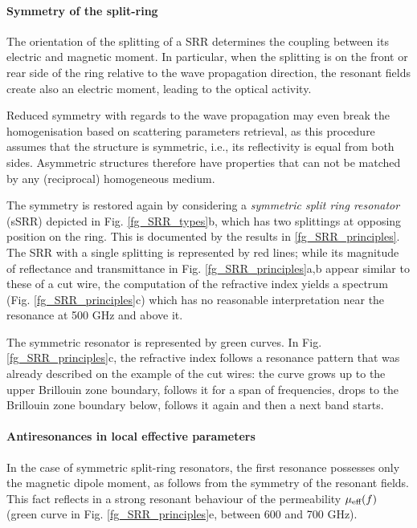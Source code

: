 \paragraph{Symmetry of the split-ring}%
The orientation of the splitting of a SRR determines the coupling between its electric and magnetic moment. In particular, when the splitting is on the front or rear side of the ring relative to the wave propagation direction, the resonant fields create also an electric moment, leading to the optical activity.

Reduced symmetry with regards to the wave propagation may even break the homogenisation based on scattering parameters retrieval, as this procedure assumes that the structure is symmetric, i.e., its reflectivity is equal from both sides. Asymmetric structures therefore have properties that can not be matched by any (reciprocal) homogeneous medium. 

The symmetry is restored again by considering a \textit{symmetric split ring resonator} (sSRR) depicted in Fig. \ref{fg_SRR_types}b, which has two splittings at opposing position on the ring. 
This is documented by the results in \ref{fg_SRR_principles}. The SRR with a single splitting is represented by red lines; while its magnitude of reflectance and transmittance in Fig. \ref{fg_SRR_principles}a,b appear similar to these of a cut wire, the computation of the refractive index yields a spectrum (Fig. \ref{fg_SRR_principles}c) which has no reasonable interpretation near the resonance at 500 GHz and above it. 

The symmetric resonator is represented by green curves. In Fig. \ref{fg_SRR_principles}c, the refractive index follows a resonance pattern that was already described on the example of the cut wires: the curve grows up to the upper Brillouin zone boundary, follows it for a span of frequencies, drops to the Brillouin zone boundary below, follows it again and then a next band starts. 

\paragraph{Antiresonances in local effective parameters}%
In the case of symmetric split-ring resonators, the first resonance possesses only the magnetic dipole moment, as follows from the symmetry of the resonant fields. This fact reflects in a strong resonant behaviour of the permeability $\mu_{\text{eff} }(f)$ (green curve in Fig. \ref{fg_SRR_principles}e, between 600 and 700 GHz). 

